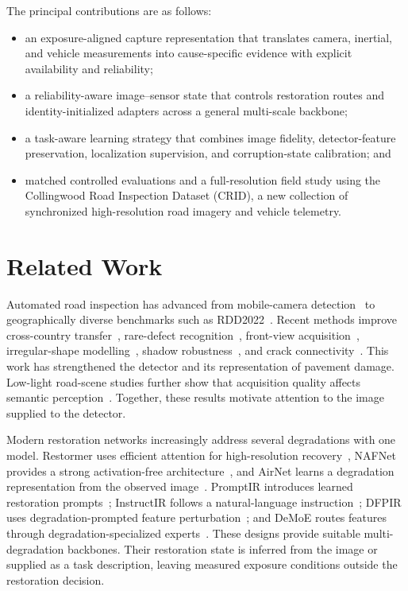 \documentclass[journal]{IEEEtran}
\begin{document}
The principal contributions are as follows:
\begin{itemize}
  \item an exposure-aligned capture representation that translates camera, inertial, and vehicle measurements into cause-specific evidence with explicit availability and reliability;
  \item a reliability-aware image--sensor state that controls restoration routes and identity-initialized adapters across a general multi-scale backbone;
  \item a task-aware learning strategy that combines image fidelity, detector-feature preservation, localization supervision, and corruption-state calibration; and
  \item matched controlled evaluations and a full-resolution field study using the Collingwood Road Inspection Dataset (CRID), a new collection of synchronized high-resolution road imagery and vehicle telemetry.
\end{itemize}

\section{Related Work}
Automated road inspection has advanced from mobile-camera detection~\cite{maeda2018road} to geographically diverse benchmarks such as RDD2022~\cite{arya2022rdd2022}. Recent methods improve cross-country transfer~\cite{lin2023dardd}, rare-defect recognition~\cite{su2022fsrdd}, front-view acquisition~\cite{li2024yoloxrdd}, irregular-shape modelling~\cite{zhang2024shapeadaptation}, shadow robustness~\cite{kong2025shadowrobust}, and crack connectivity~\cite{jing2025topologycrack}. This work has strengthened the detector and its representation of pavement damage. Low-light road-scene studies further show that acquisition quality affects semantic perception~\cite{wang2022sfnetn}. Together, these results motivate attention to the image supplied to the detector.

Modern restoration networks increasingly address several degradations with one model. Restormer uses efficient attention for high-resolution recovery~\cite{zamir2022restormer}, NAFNet provides a strong activation-free architecture~\cite{chen2022nafnet}, and AirNet learns a degradation representation from the observed image~\cite{li2022airnet}. PromptIR introduces learned restoration prompts~\cite{potlapalli2023promptir}; InstructIR follows a natural-language instruction~\cite{conde2024instructir}; DFPIR uses degradation-prompted feature perturbation~\cite{tian2025dfpir}; and DeMoE routes features through degradation-specialized experts~\cite{feijoo2025demoe}. These designs provide suitable multi-degradation backbones. Their restoration state is inferred from the image or supplied as a task description, leaving measured exposure conditions outside the restoration decision.
\end{document}
